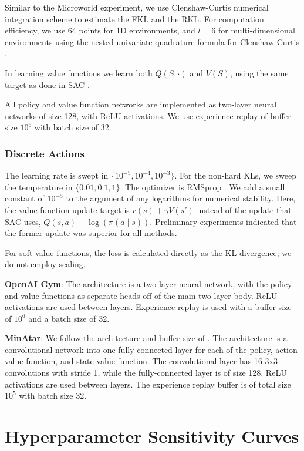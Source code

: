 \documentclass{article}
\begin{document}
Similar to the Microworld experiment, we use Clenshaw-Curtis \citep{clenshaw1960method} numerical integration scheme to estimate the FKL and the RKL. For computation efficiency, we use 64 points for 1D environments, and $l=6$ for multi-dimensional environments using the nested univariate quadrature formula for Clenshaw-Curtis \citep{gerstner1998numerical}.

In learning value functions we learn both $Q(S,\cdot)$ and $V(S)$, using the same target as done in SAC \citep{haarnoja2018soft}. 

All policy and value function networks are implemented as two-layer neural networks of size 128, with ReLU activations. We use experience replay of buffer size $10^6$ with batch size of 32.

\subsubsection{Discrete Actions}
The learning rate is swept in $\{10^{-5}, 10^{-4}, 10^{-3}\}$. For the non-hard KLs, we sweep the temperature in $\{0.01, 0.1, 1\}$. The optimizer is RMSprop \citep{tieleman2012lecture}. We add a small constant of $10^{-5}$ to the argument of any logarithms for numerical stability. Here, the value function update target is $r(s) + \gamma V(s')$ instead of the update that SAC uses, $Q(s, a) - \log(\pi(a \mid s))$. Preliminary experiments indicated that the former update was superior for all methods. 

For soft-value functions, the loss is calculated directly as the KL divergence; we do not employ scaling. 

\textbf{OpenAI Gym}: The architecture is a two-layer neural network, with the policy and value functions as separate heads off of the main two-layer body. ReLU activations are used between layers. Experience replay is used with a buffer size of $10^6$ and a batch size of 32.

\textbf{MinAtar}: We follow the architecture and buffer size of \citep{young2019minatar}. The architecture is a convolutional network into one fully-connected layer for each of the policy, action value function, and state value function. The convolutional layer has 16 3x3 convolutions with stride 1, while the fully-connected layer is of size 128. ReLU activations are used between layers. The experience replay buffer is of total size $10^5$ with batch size 32. 


\section{Hyperparameter Sensitivity Curves}
\end{document}
